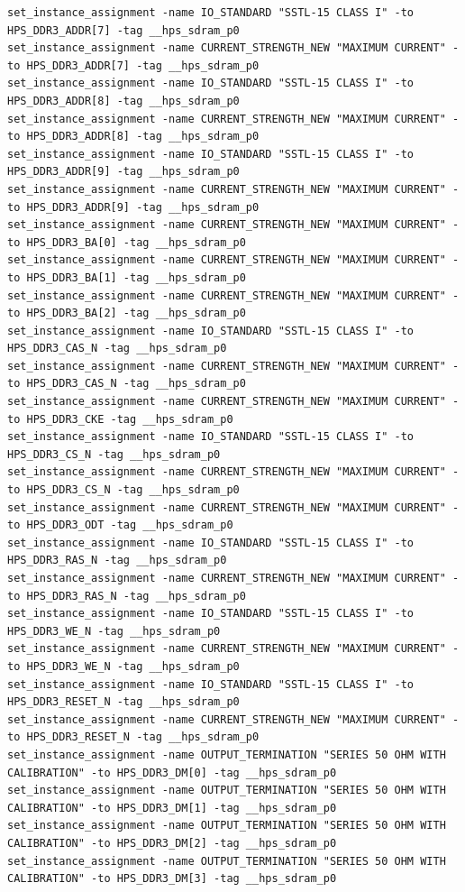\documentclass[conference]{IEEEtran}
\begin{document}
\begin{lstlisting}
set_instance_assignment -name IO_STANDARD "SSTL-15 CLASS I" -to HPS_DDR3_ADDR[7] -tag __hps_sdram_p0
set_instance_assignment -name CURRENT_STRENGTH_NEW "MAXIMUM CURRENT" -to HPS_DDR3_ADDR[7] -tag __hps_sdram_p0
set_instance_assignment -name IO_STANDARD "SSTL-15 CLASS I" -to HPS_DDR3_ADDR[8] -tag __hps_sdram_p0
set_instance_assignment -name CURRENT_STRENGTH_NEW "MAXIMUM CURRENT" -to HPS_DDR3_ADDR[8] -tag __hps_sdram_p0
set_instance_assignment -name IO_STANDARD "SSTL-15 CLASS I" -to HPS_DDR3_ADDR[9] -tag __hps_sdram_p0
set_instance_assignment -name CURRENT_STRENGTH_NEW "MAXIMUM CURRENT" -to HPS_DDR3_ADDR[9] -tag __hps_sdram_p0
set_instance_assignment -name CURRENT_STRENGTH_NEW "MAXIMUM CURRENT" -to HPS_DDR3_BA[0] -tag __hps_sdram_p0
set_instance_assignment -name CURRENT_STRENGTH_NEW "MAXIMUM CURRENT" -to HPS_DDR3_BA[1] -tag __hps_sdram_p0
set_instance_assignment -name CURRENT_STRENGTH_NEW "MAXIMUM CURRENT" -to HPS_DDR3_BA[2] -tag __hps_sdram_p0
set_instance_assignment -name IO_STANDARD "SSTL-15 CLASS I" -to HPS_DDR3_CAS_N -tag __hps_sdram_p0
set_instance_assignment -name CURRENT_STRENGTH_NEW "MAXIMUM CURRENT" -to HPS_DDR3_CAS_N -tag __hps_sdram_p0
set_instance_assignment -name CURRENT_STRENGTH_NEW "MAXIMUM CURRENT" -to HPS_DDR3_CKE -tag __hps_sdram_p0
set_instance_assignment -name IO_STANDARD "SSTL-15 CLASS I" -to HPS_DDR3_CS_N -tag __hps_sdram_p0
set_instance_assignment -name CURRENT_STRENGTH_NEW "MAXIMUM CURRENT" -to HPS_DDR3_CS_N -tag __hps_sdram_p0
set_instance_assignment -name CURRENT_STRENGTH_NEW "MAXIMUM CURRENT" -to HPS_DDR3_ODT -tag __hps_sdram_p0
set_instance_assignment -name IO_STANDARD "SSTL-15 CLASS I" -to HPS_DDR3_RAS_N -tag __hps_sdram_p0
set_instance_assignment -name CURRENT_STRENGTH_NEW "MAXIMUM CURRENT" -to HPS_DDR3_RAS_N -tag __hps_sdram_p0
set_instance_assignment -name IO_STANDARD "SSTL-15 CLASS I" -to HPS_DDR3_WE_N -tag __hps_sdram_p0
set_instance_assignment -name CURRENT_STRENGTH_NEW "MAXIMUM CURRENT" -to HPS_DDR3_WE_N -tag __hps_sdram_p0
set_instance_assignment -name IO_STANDARD "SSTL-15 CLASS I" -to HPS_DDR3_RESET_N -tag __hps_sdram_p0
set_instance_assignment -name CURRENT_STRENGTH_NEW "MAXIMUM CURRENT" -to HPS_DDR3_RESET_N -tag __hps_sdram_p0
set_instance_assignment -name OUTPUT_TERMINATION "SERIES 50 OHM WITH CALIBRATION" -to HPS_DDR3_DM[0] -tag __hps_sdram_p0
set_instance_assignment -name OUTPUT_TERMINATION "SERIES 50 OHM WITH CALIBRATION" -to HPS_DDR3_DM[1] -tag __hps_sdram_p0
set_instance_assignment -name OUTPUT_TERMINATION "SERIES 50 OHM WITH CALIBRATION" -to HPS_DDR3_DM[2] -tag __hps_sdram_p0
set_instance_assignment -name OUTPUT_TERMINATION "SERIES 50 OHM WITH CALIBRATION" -to HPS_DDR3_DM[3] -tag __hps_sdram_p0

\end{lstlisting}
\end{document}
